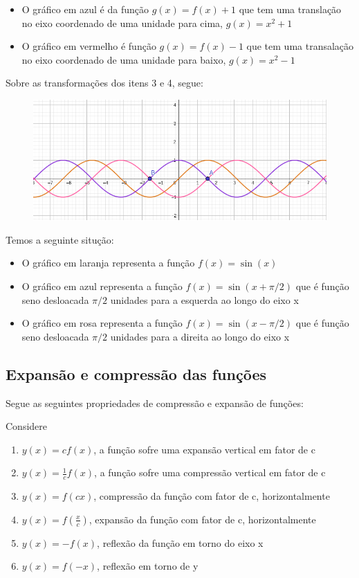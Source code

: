 \begin{multicols*}{2}
\begin{itemize}[wide, labelwidth=!, labelindent=0pt]
        \item O gráfico em azul é da função $g(x) = f(x) + 1$ que tem uma translação no eixo 							coordenado de uma unidade para cima, $g(x) = x^2 + 1 $
        \item O gráfico em vermelho é função $g(x) = f(x) - 1$ que tem uma transalação no eixo 							coordenado de uma unidade para baixo, $g(x) = x^2 -1$
    \end{itemize}
    Sobre as transformações dos itens 3 e 4, segue:
    \begin{figure}[H]
        \centering
        \includegraphics[scale=0.25]{assets/rafael/img8.png}
    \end{figure}
    Temos a seguinte situção:
    \begin{itemize}[wide, labelwidth=!, labelindent=0pt]
        \item O gráfico em laranja representa a função $f(x) = \sin(x)$
        \item O gráfico em azul representa a função $f(x) = \sin(x + \pi/2)$ que é função seno 							desloacada $\pi/2$ unidades para a esquerda ao longo do eixo x
        \item O gráfico em rosa representa a função $f(x) = \sin(x - \pi/2)$ que é função seno 							desloacada $\pi/2$ unidades para a direita ao longo do eixo x
    \end{itemize}
    \subsection*{Expansão e compressão das funções}
    Segue as seguintes propriedades de compressão e expansão de funções:

    Considere
    \begin{enumerate}[wide, labelwidth=!, labelindent=0pt]
        \item $y(x) = cf(x)$, a função sofre uma expansão vertical em fator de c
        \item $y(x) = \frac{1}{c} f(x)$, a função sofre uma compressão vertical em fator de c
        \item $ y(x) = f(cx)$, compressão da função com fator de c, horizontalmente
        \item $y(x) = f(\frac{x}{c})$, expansão da função com fator de c, horizontalmente
        \item $y(x) = -f(x)$, reflexão da função em torno do eixo x
        \item $y(x)  = f(-x)$, reflexão em torno de y
    \end{enumerate}


\end{multicols*}
